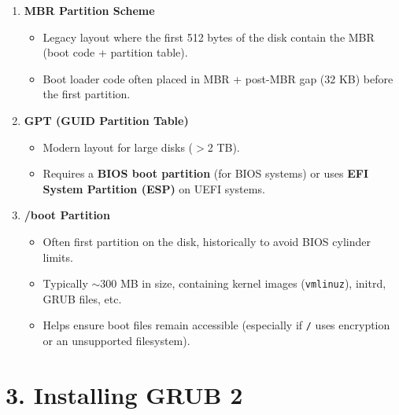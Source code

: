 \documentclass[12pt,a4paper]{report}
\begin{document}
\begin{enumerate}
    \item \textbf{MBR Partition Scheme}
    \begin{itemize}
        \item Legacy layout where the first 512 bytes of the disk contain the MBR (boot code + partition table).
        \item Boot loader code often placed in MBR + post-MBR gap (32 KB) before the first partition.
    \end{itemize}

    \item \textbf{GPT (GUID Partition Table)}
    \begin{itemize}
        \item Modern layout for large disks ($>$2 TB).
        \item Requires a \textbf{BIOS boot partition} (for BIOS systems) or uses \textbf{EFI System Partition (ESP)} on UEFI systems.
    \end{itemize}

    \item \textbf{/boot Partition}
    \begin{itemize}
        \item Often first partition on the disk, historically to avoid BIOS cylinder limits.
        \item Typically $\sim$300 MB in size, containing kernel images (\texttt{vmlinuz}), initrd, GRUB files, etc.
        \item Helps ensure boot files remain accessible (especially if \texttt{/} uses encryption or an unsupported filesystem).
    \end{itemize}
\end{enumerate}

\section*{3. Installing GRUB 2}
\end{document}
